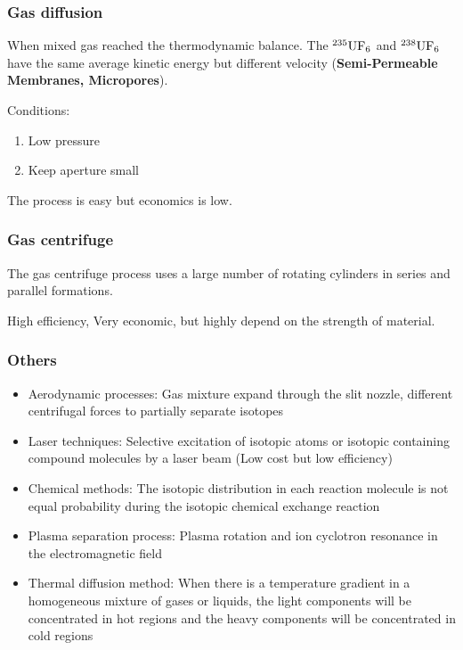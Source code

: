 \subsubsection*{Gas diffusion}

When mixed gas reached the thermodynamic balance. The ${}^{235}{\rm UF_6}$ and ${}^{238}{\rm UF_6}$ have the same average kinetic energy but different velocity ({\bfseries Semi-Permeable Membranes, Micropores}). 

Conditions:
\begin{enumerate}
    \item Low pressure
    \item Keep aperture small
\end{enumerate}

The process is easy but economics is low.

\subsubsection*{Gas centrifuge}

The gas centrifuge process uses a large number of rotating cylinders in series and parallel formations.

High efficiency, Very economic, but highly depend on the strength of material.

\subsubsection*{Others}

\begin{itemize}
    \item Aerodynamic processes: Gas mixture expand through the slit nozzle, different centrifugal forces to partially separate isotopes
    \item Laser techniques: Selective excitation of isotopic atoms or isotopic containing compound molecules by a laser beam (Low cost but low efficiency)
    \item Chemical methods: The isotopic distribution in each reaction molecule is not equal probability during the isotopic chemical exchange reaction
    \item Plasma separation process: Plasma rotation and ion cyclotron resonance in the electromagnetic field
    \item Thermal diffusion method: When there is a temperature gradient in a homogeneous mixture of gases or liquids, the light components will be concentrated in hot regions and the heavy components will be concentrated in cold regions
\end{itemize}

